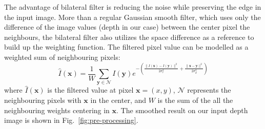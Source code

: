 The advantage of bilateral filter is reducing the noise while preserving the edge in the input image. 
More than a regular Gaussian smooth filter, which uses only the difference of the image values (depth in our case) between the center pixel the neighbours, the bilateral filter also utilizes the space difference as a reference to build up the weighting function.
The filtered pixel value can be modelled as a weighted sum of neighbouring pixels:
\begin{equation}
\hat{I}(\mathbf{x}) = \frac{1}{W}\sum_{\mathbf{y} \in \mathcal{N}} I(\mathbf{y})e^{-(\frac{\lVert I(\mathbf{x}) - I(\mathbf{y})\rVert^2}{2\sigma_r^2} + \frac{\lVert \mathbf{x} - \mathbf{y}\rVert^2}{2\sigma_d^2})}
\end{equation}
where $\hat{I}(\mathbf{x})$ is the filtered value at pixel $\mathbf{x} = (x,y)$, $\mathcal{N}$ represents the neighbouring pixels with $\mathbf{x}$ in the center, and $W$ is the sum of the all the neighbouring weights centering in $\mathbf{x}$. 
The smoothed result on our input depth image is shown in Fig.~\ref{fig:pre-processing}.

